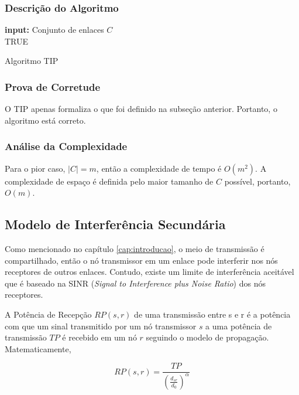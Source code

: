 \subsubsection{Descrição do Algoritmo}

\begin{algorithm}[h]
	\SetVline
	{\bf input:} Conjunto de enlaces $C$\\
	\Return TRUE
\caption{Algoritmo TIP}
\label{alg:tip}
\end{algorithm}

\subsubsection{Prova de Corretude}

O TIP apenas formaliza o que foi definido na subseção anterior. Portanto, o algoritmo está correto. 

\subsubsection{Análise da Complexidade}

Para o pior caso, $|C|=m$, então a complexidade de tempo é $O(m^2)$. A complexidade de espaço é definida pelo maior tamanho de $C$ possível, portanto, $O(m)$.

\subsection{Modelo de Interferência Secundária}

Como mencionado no capítulo \ref{cap:introducao}, o meio de transmissão é compartilhado, então o nó transmissor em um enlace pode interferir nos nós receptores de outros enlaces. Contudo, existe um limite de interferência aceitável que é baseado na SINR ({\it Signal to Interference plus Noise Ratio})   dos nós receptores.

A Potência de Recepção $RP(s,r)$ de uma transmissão entre s e r é a potência com que um sinal transmitido por um nó transmissor $s$ a uma potência de transmissão $TP$ é recebido em um nó $r$ seguindo o modelo de propagação. Matematicamente,

\begin{equation}
RP(s,r) = \frac{TP}{(\frac{d_{sr}}{d_{0}})^{\alpha}}
\label{eq:rp}
\end{equation}

